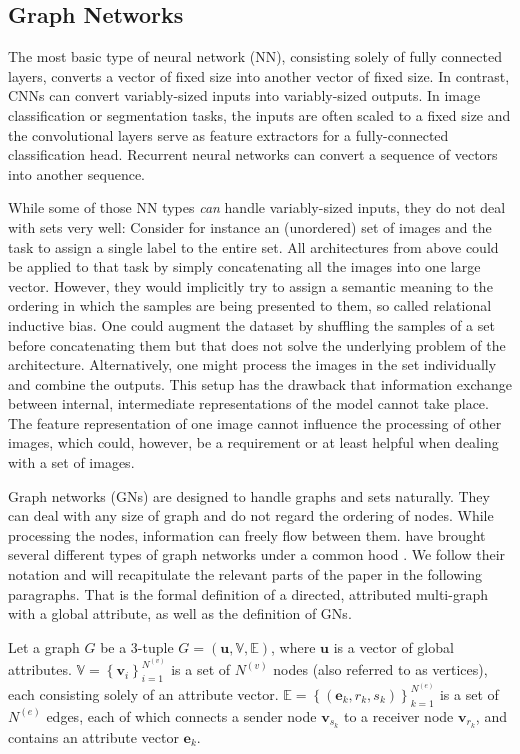 \subsection{Graph Networks}
\label{sec:graphnetworks}

The most basic type of neural network (NN), consisting solely of fully connected layers, converts a vector of fixed size into another vector of fixed size.
In contrast, CNNs can convert variably-sized inputs into variably-sized outputs. In image classification or segmentation tasks, the inputs are often scaled to a fixed size and the convolutional layers serve as feature extractors for a fully-connected classification head.
Recurrent neural networks can convert a sequence of vectors into another sequence.

While some of those NN types \textit{can} handle variably-sized inputs, they do not deal with sets very well: Consider for instance an (unordered) set of images and the task to assign a single label to the entire set. All architectures from above could be applied to that task by simply concatenating all the images into one large vector. However, they would implicitly try to assign a semantic meaning to the ordering in which the samples are being presented to them, so called relational inductive bias. One could augment the dataset by shuffling the samples of a set before concatenating them but that does not solve the underlying problem of the architecture. Alternatively, one might process the images in the set individually and combine the outputs. This setup has the drawback that information exchange between internal, intermediate representations of the model cannot take place. The feature representation of one image cannot influence the processing of other images, which could, however, be a requirement or at least helpful when dealing with a set of images.

Graph networks (GNs) are designed to handle graphs and sets naturally. They can deal with any size of graph and do not regard the ordering of nodes. While processing the nodes, information can freely flow between them. \citeauthor{deepmind:graphnets} have brought several different types of graph networks under a common hood \cite{deepmind:graphnets}. We follow their notation and will recapitulate the relevant parts of the paper in the following paragraphs. That is the formal definition of a directed, attributed multi-graph with a global attribute, as well as the definition of GNs.

Let a graph $G$ be a 3-tuple $G=\left(\bm{u},\mathbb{V},\mathbb{E}\right)$, where $\bm{u}$ is a vector of global attributes.
$\mathbb{V}=\left\{\bm{v}_i\right\}_{i=1}^{N^{(v)}}$ is a set of $N^{(v)}$ nodes (also referred to as vertices), each consisting solely of an attribute vector.
$\mathbb{E}=\left\{\left(\bm{e}_k,r_k,s_k\right)\right\}_{k=1}^{N^{(e)}}$ is a set of $N^{(e)}$ edges, each of which connects a sender node $\bm{v}_{s_k}$ to a receiver node $\bm{v}_{r_k}$, and contains an attribute vector $\bm{e}_k$.

